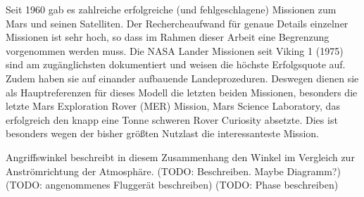 Seit 1960 gab es zahlreiche erfolgreiche (und fehlgeschlagene) Missionen zum Mars und seinen Satelliten. Der Rechercheaufwand für genaue Details einzelner Missionen ist sehr hoch, so dass im Rahmen dieser Arbeit eine Begrenzung vorgenommen werden muss. Die NASA Lander Missionen seit Viking 1 (1975) sind am zugänglichsten dokumentiert und weisen die höchste Erfolgsquote auf. Zudem haben sie auf einander aufbauende Landeprozeduren. Deswegen dienen sie als Hauptreferenzen für dieses Modell die letzten beiden Missionen, besonders die letzte Mars Exploration Rover (MER) Mission, Mars Science Laboratory, das erfolgreich den knapp eine Tonne schweren Rover Curiosity absetzte. Dies ist besonders wegen der bisher größten Nutzlast die interessanteste Mission.

 Angriffswinkel beschreibt in diesem Zusammenhang den Winkel im Vergleich zur Anströmrichtung der Atmosphäre. (TODO: Beschreiben. Maybe Diagramm?)
 (TODO: angenommenes Fluggerät beschreiben)
 (TODO: Phase beschreiben)